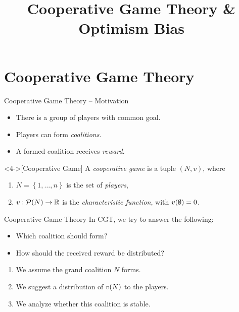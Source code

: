 \documentclass[aspectratio=169]{beamer}
\title{Cooperative Game Theory \& Optimism Bias}
\begin{document}
\maketitle

\section{Cooperative Game Theory}

\begin{frame}{Cooperative Game Theory -- Motivation}
	\begin{itemize}
		\item<1-> There is a group of players with common goal.
		\item<2-> Players can form \emph{coalitions}.
		\item<3-> A formed coalition receives \emph{reward}.
	\end{itemize}
	\vspace{2em}
	\begin{definition}<4->[Cooperative Game]
		A \emph{cooperative game} is a tuple $ \left( N,v \right) $, where \begin{enumerate}
			\item $ N = \left\{ 1, \ldots, n \right\} $ is the set of \emph{players},
			\item $ v: \mathcal{P}\!\left(N\right) \to \mathbb{R} $ is the \emph{characteristic function}, with $ v\!\left(\emptyset\right) = 0 $.
		\end{enumerate}
	\end{definition}
\end{frame}

\begin{frame}{Cooperative Game Theory}
	In CGT, we try to answer the following:
	\begin{itemize}[ ]
		\item Which coalition should form?
		\item How should the received reward be distributed?
	\end{itemize}
	\begin{enumerate}
		\item<3-> We assume the grand coalition $ N $ forms.
		\item<4-> We suggest a distribution of $ v\!\left(N\right) $ to the players.
		\item<5-> We analyze whether this coalition is stable.
	\end{enumerate}
\end{frame}
\end{document}
